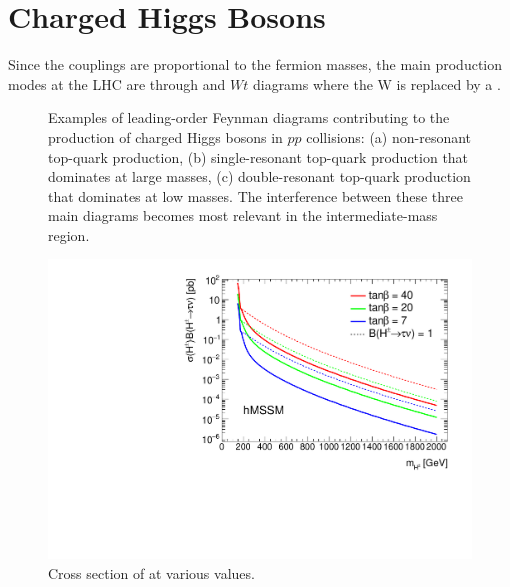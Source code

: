 \section{Charged Higgs Bosons}\label{sec:Hpm}
	Since the \Hpm couplings are proportional to the fermion masses, the main production modes at the LHC are through \ttbar and $Wt$ diagrams where the W is replaced by a \Hpm.
	\begin{figure}[!ht]
		\centering
		\caption{\label{fig:hpm-diagrams} Examples of leading-order Feynman diagrams contributing to the production of 
		charged Higgs bosons in $pp$ collisions: (a) non-resonant top-quark production, (b) single-resonant 
		top-quark production that dominates at large \Hpm masses, (c) double-resonant top-quark production that 
		dominates at low \Hpm masses. The interference between these three main diagrams becomes 
		most relevant in the intermediate-mass region.}
	\end{figure}
	\begin{figure}[!ht]
		\centering
		\includegraphics[width=0.75\linewidth]{chapters/chapter1_theory/images/XSBR_hmssm.pdf}
		\caption{\label{fig:hpm-xsec} Cross section of \Hpm at various \tanb values.}
	\end{figure}
